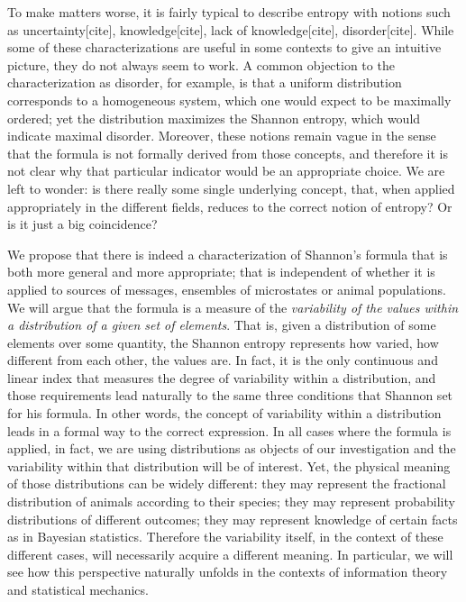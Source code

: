 \documentclass{article}
\begin{document}
To make matters worse, it is fairly typical to describe entropy with notions such as uncertainty[cite], knowledge[cite], lack of knowledge[cite], disorder[cite]. While some of these characterizations are useful in some contexts to give an intuitive picture, they do not always seem to work. A common objection to the characterization as disorder, for example, is that a uniform distribution corresponds to a homogeneous system, which one would expect to be maximally ordered; yet the distribution maximizes the Shannon entropy, which would indicate maximal disorder. Moreover, these notions remain vague in the sense that the formula is not formally derived from those concepts, and therefore it is not clear why that particular indicator would be an appropriate choice. We are left to wonder: is there really some single underlying concept, that, when applied appropriately in the different fields, reduces to the correct notion of entropy? Or is it just a big coincidence?

We propose that there is indeed a characterization of Shannon's formula that is both more general and more appropriate; that is independent of whether it is applied to sources of messages, ensembles of microstates or animal populations. We will argue that the formula is a measure of the \emph{variability of the values within a distribution of a given set of elements}. That is, given a distribution of some elements over some quantity, the Shannon entropy represents how varied, how different from each other, the values are. In fact, it is the only continuous and linear index that measures the degree of variability within a distribution, and those requirements lead naturally to the same three conditions that Shannon set for his formula.\cite{Shannon} In other words, the concept of variability within a distribution leads in a formal way to the correct expression. In all cases where the formula is applied, in fact, we are using distributions as objects of our investigation and the variability within that distribution will be of interest. Yet, the physical meaning of those distributions can be widely different: they may represent the fractional distribution of animals according to their species; they may represent probability distributions of different outcomes; they may represent knowledge of certain facts as in Bayesian statistics. Therefore the variability itself, in the context of these different cases, will necessarily acquire a different meaning. In particular, we will see how this perspective naturally unfolds in the contexts of information theory and statistical mechanics. 
\end{document}
